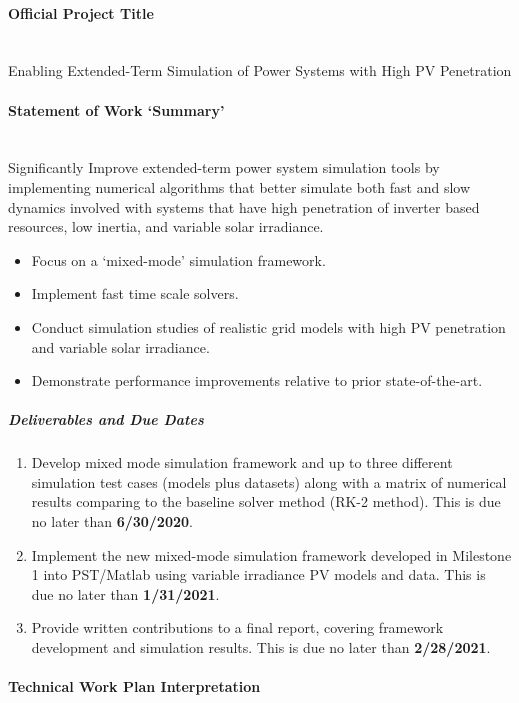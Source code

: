 \documentclass[12pt]{article}
\begin{document}
\paragraph{Official Project Title} \ \\
Enabling Extended-Term Simulation of Power Systems with High PV Penetration
\paragraph{Statement of Work `Summary'} \ \\
Significantly Improve extended-term power system simulation tools by implementing numerical algorithms that better simulate both fast and slow dynamics involved with systems that have high penetration of inverter based resources, low inertia, and variable solar irradiance.
\begin{itemize}

\item  Focus on a `mixed-mode' simulation framework.
\item  Implement fast time scale solvers.
\item  Conduct simulation studies of realistic grid models with high PV penetration and variable solar irradiance.
\item Demonstrate performance improvements relative to prior state-of-the-art.

\end{itemize}
\subparagraph{Deliverables and Due Dates}
\begin{enumerate}
\item Develop mixed mode simulation framework and up to three different simulation test cases (models plus datasets) along with a matrix of numerical results comparing to the baseline solver method (RK-2 method).
This is due no later than \textbf{6/30/2020}.
\item Implement the new mixed-mode simulation framework developed in Milestone 1 into PST/Matlab using variable irradiance PV models and data.
This is due no later than   \textbf{1/31/2021}.
\item Provide written contributions to a final report, covering framework development and simulation results.
This is due no later than  \textbf{2/28/2021}.
\end{enumerate}

\pagebreak
\paragraph{Technical Work Plan Interpretation} \ 
\end{document}
